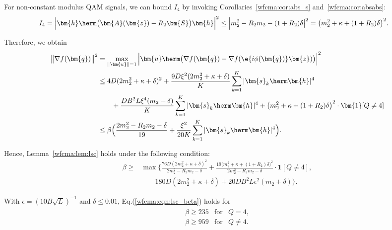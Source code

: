 For non-constant modulus QAM signals, we can bound $I_4$ by invoking Corollaries~\ref{wfcma:cor:abs_s} and~\ref{wfcma:cor:absabs}:
\begin{align}
	I_4&=\Big|\bm{h}\herm\big(\bm{A}(\bm{z})-R_2\bm{S}\big)\bm{h}\Big|^2
	\leq \Big|m_2^2-R_2m_2-(1+R_2)\delta\big|^2=\big(m_2^2+\kappa+(1+R_2)\delta\big)^2.\nonumber
\end{align}

Therefore, we obtain
\begin{align}
	\big\|\nabla f(\bm{q})\big\|^2 
	&=
	\max_{\|\bm{u}\|=1}\Big|\bm{u}\herm\big(\nabla f(\bm{q})-\nabla f(\e{i\phi(\bm{q})}\bm{z})\big)\Big|^2
	\nonumber\\&
	\leq 4D(2 m_2^2+\kappa+\delta)^2
	+\frac{9D\xi^2(2 m_2^2+\kappa+\delta)}{K}\sum_{k=1}^K|\bm{s}_k\herm\bm{h}|^4
	\nonumber\\&\qquad
	+\frac{DB^2L\xi^4(  m_2+\delta)}{K}\sum_{k=1}^K|\bm{s}_k\herm\bm{h}|^4
	+\big(m_2^2+\kappa+(1+R_2)\delta\big)^2\cdot\bm{1}[Q\neq 4]
	\nonumber\\
	&\leq\beta\Big(\frac{2  m_2^2-R_2m_2-\delta}{19}+\frac{\xi^2}{20K}\sum_{k=1}^K|\bm{s}_k\herm\bm{h}|^4\Big).\nonumber
\end{align}

Hence, Lemma~\ref{wfcma:lem:lsc} holds under the following condition:
\begin{align}
	\beta\geq&\max\Big\{\frac{76D(2m_2^2+\kappa+\delta)^2}{2m_2^2-R_2m_2-\delta}
	+\frac{19(m_2^2+\kappa+(1+R_2)\delta\big)^2}{2m_2^2-R_2m_2-\delta}\cdot\bm{1}[Q\neq4], \nonumber\\
	&\qquad 180D(2m_2^2+\kappa+\delta)+20DB^2L\epsilon^2(m_2+\delta)\Big\}.\label{wfcma:eqn:lsc_beta}
\end{align}

With $\epsilon=(10B\sqrt{L})^{-1}$ and $\delta\leq0.01$, Eq.(\ref{wfcma:eqn:lsc_beta}) holds for 
\begin{align}
	\begin{array}{lcc}
		\beta\geq 235&\text{for}&Q=4,\\
		\beta\geq 959&\text{for}&Q\neq4.\\
	\end{array}	\nonumber
\end{align} 